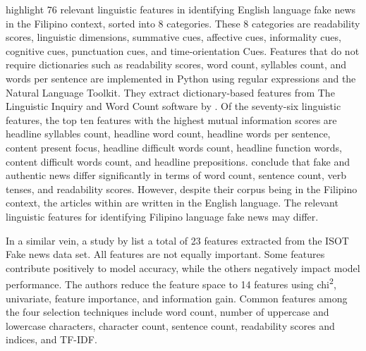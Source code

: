  highlight 76 relevant linguistic features in identifying English language fake news in the Filipino context, sorted into 8 categories. These 8 categories are readability scores, linguistic dimensions, summative cues, affective cues, informality cues, cognitive cues, punctuation cues, and time-orientation Cues. Features that do not require dictionaries such as readability scores, word count, syllables count, and words per sentence are implemented in Python using regular expressions and the Natural Language Toolkit. They extract dictionary-based features from The Linguistic Inquiry and Word Count software by . Of the seventy-six linguistic features, the top ten features with the highest mutual information scores are headline syllables count, headline word count, headline words per sentence, content present focus, headline difficult words count, headline function words, content difficult words count, and headline prepositions.  conclude that fake and authentic news differ significantly in terms of word count, sentence count, verb tenses, and readability scores. However, despite their corpus being in the Filipino context, the articles within are written in the English language. The relevant linguistic features for identifying Filipino language fake news may differ.

In a similar vein, a study by  list a total of 23 features extracted from the ISOT Fake news data set. All features are not equally important. Some features contribute positively to model accuracy, while the others negatively impact model performance. The authors reduce the feature space to 14 features using chi\textsuperscript{2}, univariate, feature importance, and information gain. Common features among the four selection techniques include word count, number of uppercase and lowercase characters, character count, sentence count, readability scores and indices, and TF-IDF.

